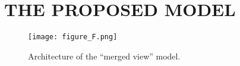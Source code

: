 \documentclass{article}
\begin{document}
\section{THE PROPOSED MODEL}
\label{sec:model}
\begin{figure}[b]
\centering
\texttt{[image: figure\_F.png]}
\caption{Architecture of the ``merged view'' model.}
\label{fig:mview}
\end{figure}
\begin{comment}
\subsection{Layer types}
\label{subsec:lt}
\begin{itemize}
\item {Convolution layer} \\
Convolutional layer has a number of filters, i.e., kernels, that slide over the input matrix and multiply their corresponding weights to the input matrix and output a new matrix. 
Assume the input to the convolutional layer is a $m \times n \times c$ matrix, where $m$ and $n$ correspond to the height and weight of image, respectively, and $c$ is the number of channels. For example, if the input is the original image (given to the first layer), $c$ is $3$ in RGB scale and $1$ in gray-scale format. The size of filters are smaller than the input. Using $K$ filters with the size of $f \times f \times c$, the output dimension is $K\times(m-f+1)\times(n-f+1) \times c$. Each $(m-f+1)\times(n-f+1)$ slice is called feature map.
\item {Pooling layer and activation}\\
Feature maps are usually subsampled using max (or mean) operation. A square matrix slides over the feature map and gives the maximum value among the elements inside it. The size of the max-pooling matrix is usually between $2\times 2$ and $5 \times 5$. 
Therefore, it can subsample the feature maps between $2$ to $5$ times, depending on its size.
A layer of activation functions is used to determine the neuron's output. A popular activation function is rectified linear unit (ReLU) which is $\textrm{max}(0,x)$ and we have used that in our model as well.


\end{comment}
\end{document}
